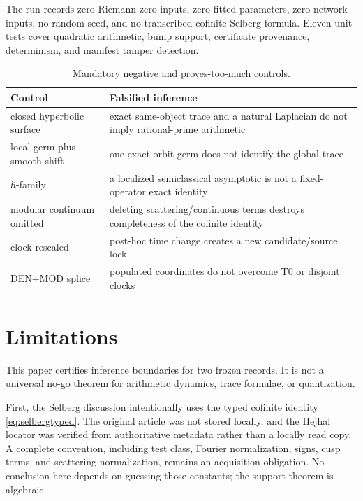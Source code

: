 \documentclass[11pt]{article}
\theoremstyle{definition}
\theoremstyle{remark}
\begin{document}
The run records zero Riemann-zero inputs, zero fitted parameters, zero network
inputs, no random seed, and no transcribed cofinite Selberg formula.  Eleven
unit tests cover quadratic arithmetic, bump support, certificate provenance,
determinism, and manifest tamper detection.

\begin{table}[ht]
\centering
\caption{Mandatory negative and proves-too-much controls.}
\label{tab:controls}
\small
\begin{tabularx}{\textwidth}{P{0.28\textwidth}>{\raggedright\arraybackslash}X}
\toprule
Control & Falsified inference\\
\midrule
closed hyperbolic surface & exact same-object trace and a natural Laplacian do not imply rational-prime arithmetic\\
local germ plus smooth shift & one exact orbit germ does not identify the global trace\\
\(\hbar\)-family & a localized semiclassical asymptotic is not a fixed-operator exact identity\\
modular continuum omitted & deleting scattering/continuous terms destroys completeness of the cofinite identity\\
clock rescaled & post-hoc time change creates a new candidate/source lock\\
DEN+MOD splice & populated coordinates do not overcome T0 or disjoint clocks\\
\bottomrule
\end{tabularx}
\end{table}

\section{Limitations}
\label{sec:limitations}

This paper certifies inference boundaries for two frozen records.  It is not
a universal no-go theorem for arithmetic dynamics, trace formulae, or
quantization.

First, the Selberg discussion intentionally uses the typed cofinite identity
\eqref{eq:selbergtyped}.  The original article was not stored locally, and
the Hejhal locator was verified from authoritative metadata rather than a
locally read copy.  A complete convention, including test class, Fourier
normalization, signs, cusp terms, and scattering normalization, remains an
acquisition obligation.  No conclusion here depends on guessing those
constants; the support theorem is algebraic.
\end{document}
